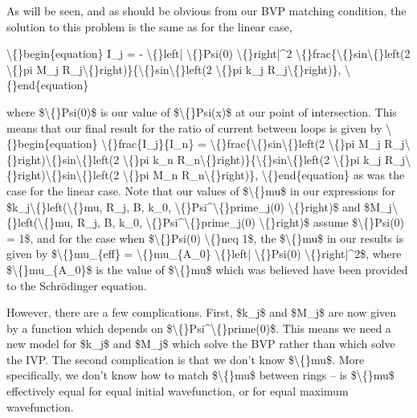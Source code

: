 \documentclass{article}
\begin{document}
As will be seen, and as should be obvious from our BVP matching condition, the solution to this problem is the same as for the linear case,

\textbackslash\{\}begin\{equation\}
I\_j = - \textbackslash\{\}left| \textbackslash\{\}Psi(0) \textbackslash\{\}right|\textasciicircum{}2 \textbackslash\{\}frac\{\textbackslash\{\}sin\textbackslash\{\}left(2 \textbackslash\{\}pi M\_j R\_j\textbackslash\{\}right)\}\{\textbackslash\{\}sin\textbackslash\{\}left(2 \textbackslash\{\}pi k\_j R\_j\textbackslash\{\}right)\},
\textbackslash\{\}end\{equation\}

where \$\textbackslash\{\}Psi(0)\$ is our value of \$\textbackslash\{\}Psi(x)\$ at our point of intersection. This means that our final result for the ratio of current between loops is given by
\textbackslash\{\}begin\{equation\}
\textbackslash\{\}frac\{I\_j\}\{I\_n\} = \textbackslash\{\}frac\{\textbackslash\{\}sin\textbackslash\{\}left(2 \textbackslash\{\}pi M\_j R\_j\textbackslash\{\}right)\textbackslash\{\}sin\textbackslash\{\}left(2 \textbackslash\{\}pi k\_n R\_n\textbackslash\{\}right)\}\{\textbackslash\{\}sin\textbackslash\{\}left(2 \textbackslash\{\}pi k\_j R\_j\textbackslash\{\}right)\textbackslash\{\}sin\textbackslash\{\}left(2 \textbackslash\{\}pi M\_n R\_n\textbackslash\{\}right)\},
\textbackslash\{\}end\{equation\}
as was the case for the linear case. Note that our values of \$\textbackslash\{\}mu\$ in our expressions for \$k\_j\textbackslash\{\}left(\textbackslash\{\}mu, R\_j, B, k\_0, \textbackslash\{\}Psi\textasciicircum{}\textbackslash\{\}prime\_j(0) \textbackslash\{\}right)\$ and \$M\_j\textbackslash\{\}left(\textbackslash\{\}mu, R\_j, B, k\_0, \textbackslash\{\}Psi\textasciicircum{}\textbackslash\{\}prime\_j(0) \textbackslash\{\}right)\$ assume \$\textbackslash\{\}Psi(0) = 1\$, and for the case when \$\textbackslash\{\}Psi(0) \textbackslash\{\}neq 1\$, the \$\textbackslash\{\}mu\$ in our results is given by \$\textbackslash\{\}mu\_\{eff\} = \textbackslash\{\}mu\_\{A\_0\} \textbackslash\{\}left| \textbackslash\{\}Psi(0) \textbackslash\{\}right|\textasciicircum{}2\$, where \$\textbackslash\{\}mu\_\{A\_0\}\$ is the value of \$\textbackslash\{\}mu\$ which was believed have been provided to the Schr\"{o}dinger equation.

However, there are a few complications. First, \$k\_j\$ and \$M\_j\$ are now given by a function which depends on \$\textbackslash\{\}Psi\textasciicircum{}\textbackslash\{\}prime(0)\$. This means we need a new model for \$k\_j\$ and \$M\_j\$ which solve the BVP rather than which solve the IVP. The second complication is that we don't know \$\textbackslash\{\}mu\$. More specifically, we don't know how to match \$\textbackslash\{\}mu\$ between rings -- is \$\textbackslash\{\}mu\$ effectively equal for equal initial wavefunction, or for equal maximum wavefunction. 
\end{document}
